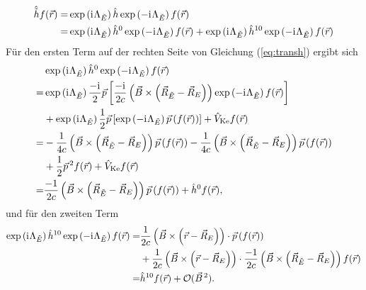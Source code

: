 	\begin{equation}\label{eq:transh}
	\begin{aligned}
	\hat{\tilde{h}}f(\vec{r})=&\exp\left(\mathrm{i}\mkern1mu\Lambda_{\tilde{E}}\right)\hat{h}\exp\left(-\mathrm{i}\mkern1mu\Lambda_{\tilde{E}}\right)f(\vec{r})\\
	=&\exp\left(\mathrm{i}\mkern1mu\Lambda_{\tilde{E}}\right)\hat{h}^0\exp\left(-\mathrm{i}\mkern1mu\Lambda_{\tilde{E}}\right)f(\vec{r})+\exp\left(\mathrm{i}\mkern1mu\Lambda_{\tilde{E}}\right)\hat{h}^{10}\exp\left(-\mathrm{i}\mkern1mu\Lambda_{\tilde{E}}\right)f(\vec{r})
	\end{aligned}
	\end{equation}
	Für den ersten Term auf der rechten Seite von Gleichung (\ref{eq:transh}) ergibt sich
	\begin{equation}\label{eq:transh1}
	\begin{aligned}
	&\exp\left(\mathrm{i}\mkern1mu\Lambda_{\tilde{E}}\right)\hat{h}^0\exp\left(-\mathrm{i}\mkern1mu\Lambda_{\tilde{E}}\right)f(\vec{r})\\
	=&\exp\left(\mathrm{i}\mkern1mu\Lambda_{\tilde{E}}\right)\frac{-\mathrm{i}\mkern1mu}{2}\vec{p}\left[\frac{-\mathrm{i}\mkern1mu}{2c}\left(\vec{B}\times\left(\vec{R}_{\tilde{E}}-\vec{R}_E\right)\right)\exp\left(-\mathrm{i}\mkern1mu\Lambda_{\tilde{E}}\right)f(\vec{r})\right]\\
	&+\exp\left(\mathrm{i}\mkern1mu\Lambda_{\tilde{E}}\right)\frac{1}{2}\vec{p}\left[\exp\left(-\mathrm{i}\mkern1mu\Lambda_{\tilde{E}}\right)\vec{p}\left(f(\vec{r})\right)\right]+\hat{V}_{\textrm{Ke}}f(\vec{r})\\
	=&-\frac{1}{4c}\left(\vec{B}\times\left(\vec{R}_{\tilde{E}}-\vec{R}_E\right)\right)\vec{p}\left(f(\vec{r})\right)
	-\frac{1}{4c}\left(\vec{B}\times\left(\vec{R}_{\tilde{E}}-\vec{R}_E\right)\right)\vec{p}\left(f(\vec{r})\right)\\
	&+\frac{1}{2}\vec{p}^{\,2}f(\vec{r})+\hat{V}_{\textrm{Ke}}f(\vec{r})\\
	=&\frac{-1}{2c}\left(\vec{B}\times\left(\vec{R}_{\tilde{E}}-\vec{R}_E\right)\right)\vec{p}\left(f(\vec{r})\right)+\hat{h}^0f(\vec{r}),
	\end{aligned}
	\end{equation}
	und für den zweiten Term
	\begin{equation}\label{eq:transh2}
	\begin{aligned}
	\exp\left(\mathrm{i}\mkern1mu\Lambda_{\tilde{E}}\right)\hat{h}^{10}\exp\left(-\mathrm{i}\mkern1mu\Lambda_{\tilde{E}}\right)f(\vec{r})=&\frac{1}{2c}\left(\vec{B}\times\left(\vec{r}-\vec{R}_E\right)\right)\cdot\vec{p}\left(f(\vec{r})\right)\\
	&+\frac{1}{2c}\left(\vec{B}\times\left(\vec{r}-\vec{R}_E\right)\right)\cdot\frac{-1}{2c}\left(\vec{B}\times\left(\vec{R}_{\tilde{E}}-\vec{R}_E\right)\right)f(\vec{r})\\
	=&\hat{h}^{10}f(\vec{r})+\mathcal{O}(\vec{B}^{\,2}).
	\end{aligned}
	\end{equation}
